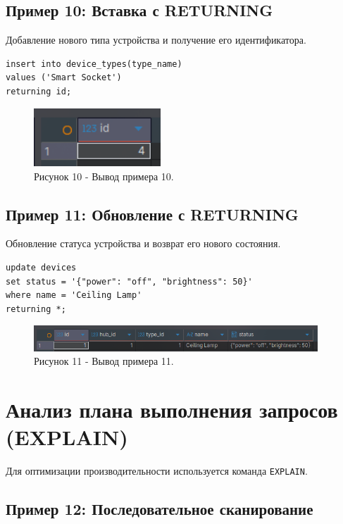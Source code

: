 \documentclass[oneside,a4paper,14pt]{extarticle}
\begin{document}
\subsection*{Пример 10: Вставка с RETURNING}

Добавление нового типа устройства и получение его идентификатора.

\begin{verbatim}
insert into device_types(type_name) 
values ('Smart Socket') 
returning id;
\end{verbatim}

\begin{figure}[H]
  \centering
  \includegraphics[width=0.425\textwidth]{pics/returning.png}
  \caption*{Рисунок 10 - Вывод примера 10.}
\end{figure}

\subsection*{Пример 11: Обновление с RETURNING}

Обновление статуса устройства и возврат его нового состояния.

\begin{verbatim}
update devices 
set status = '{"power": "off", "brightness": 50}' 
where name = 'Ceiling Lamp' 
returning *;
\end{verbatim}

\begin{figure}[H]
  \centering
  \includegraphics[width=0.95\textwidth]{pics/returning_2.png}
  \caption*{Рисунок 11 - Вывод примера 11.}
\end{figure}

\section*{Анализ плана выполнения запросов (EXPLAIN)}

Для оптимизации производительности используется команда \texttt{EXPLAIN}.

\subsection*{Пример 12: Последовательное сканирование}
\end{document}

